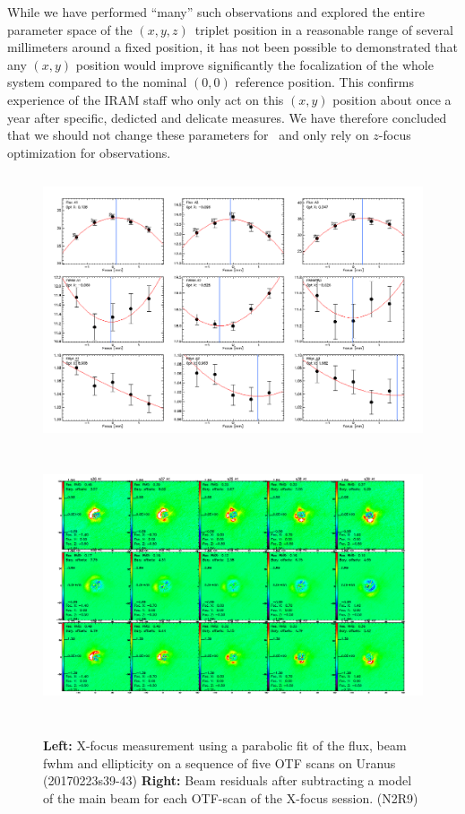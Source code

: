 While we have performed ``many'' such observations and explored the entire
parameter space of the $(x,y,z)$~triplet position in a reasonable range of
several millimeters around a fixed position, it has not been possible to
demonstrated that any $(x,y)$ position would improve significantly the
focalization of the whole system compared to the nominal $(0,0)$ reference
position. This confirms experience of the IRAM staff who only act on this
$(x,y)$ position about once a year after specific, dedicted and delicate
measures. We have therefore concluded that we should not change these parameters
for \nika\ and only rely on $z$-focus optimization for observations.

\begin{figure}[h!]
\centering
\includegraphics[height=8cm]{Figures/plot_20170223s39.png}
\hspace{0.5cm}
\includegraphics[height=8cm]{Figures/residuals_focus_otf_20170223s39.png}
\caption[Lateral X focus measures]{\textbf{Left:} X-focus measurement using a
    parabolic fit of the flux, beam fwhm and ellipticity on a sequence
    of five OTF scans on Uranus (20170223s39-43) \textbf{Right:} Beam residuals
    after subtracting a model of the main beam for each OTF-scan of the X-focus
    session. (N2R9)}
\label{fig:X_focus}
\end{figure}

